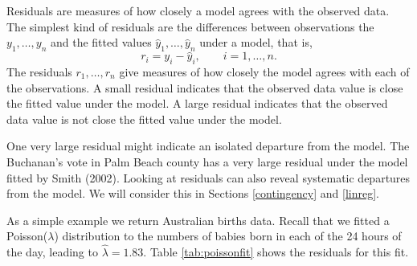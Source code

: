 \documentclass[
  british,
  11pt,
  openany, a4paper]{book}
\begin{document}
Residuals are measures of how closely a model agrees with the observed data.
The simplest kind of residuals are the differences between observations the \(y_1, \ldots, y_n\) and the fitted values \(\hat{y}_1,\ldots,\hat{y}_n\) under a model, that is,
\[ r_i = y_i-\hat{y}_i, \qquad i=1,\ldots,n. \]
The residuals \(r_1,\ldots, r_n\) give measures of how closely the model agrees with each of the observations. A small residual indicates that the observed data value is close the fitted value under the model. A large residual indicates that the observed data value is not close the fitted value under the model.

One very large residual might indicate an isolated departure from the model. The Buchanan's vote in Palm Beach county has a very large residual under the model fitted by Smith (2002). Looking at residuals can also reveal systematic departures from the model. We will consider this in Sections \ref{contingency} and \ref{linreg}.

As a simple example we return Australian births data. Recall that we fitted a Poisson(\(\lambda\)) distribution to the numbers of babies born in each of the 24 hours of the day, leading to \(\hat{\lambda} = 1.83\). Table \ref{tab:poissonfit} shows the residuals for this fit.
\end{document}
